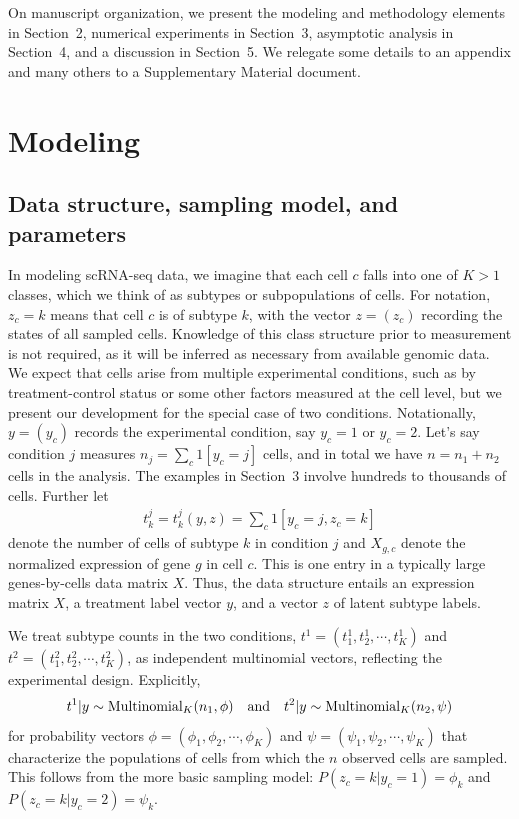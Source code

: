 \documentclass[aoas,preprint]{imsart}
\begin{document}
On manuscript organization, we present
the modeling and methodology elements in Section~2, numerical experiments in Section~3,  asymptotic analysis in Section~4, and a discussion
in Section~5.  We relegate some details to an appendix and many others to a Supplementary 
Material document.



\section{Modeling}
\subsection{Data structure, sampling model, and parameters}

In modeling scRNA-seq data, we
imagine that each cell $c$ falls into one of $K>1$ classes, which we think of as
subtypes or subpopulations of cells. For notation, $z_c=k$ means that cell $c$ is of subtype $k$, with the vector $z=(z_c)$ recording
the states of all sampled cells.  Knowledge of this class structure
 prior to measurement is not required, as it will be inferred as necessary from
 available genomic data.   We expect that cells arise from multiple
experimental conditions, such as by treatment-control status or some other factors
 measured at the cell level, but we present our development for the special
case of two conditions.  Notationally, $y=(y_c)$ records the experimental condition, say $y_c=1$ or $y_c=2$.
 Let's say condition $j$ measures $n_j=\sum_{c} 1[y_c=j]$ cells,  and
in total we have $n=n_1+n_2$ cells in the analysis.  The examples in Section~3 involve hundreds to thousands of cells.
Further let \begin{eqnarray}
\label{eq:counts}
t^j_k = t^j_k(y,z) = \sum_c 1[y_c=j, z_c=k] 
\end{eqnarray}
denote the number of cells of subtype $k$ in condition $j$
and $X_{g,c}$ denote
the normalized expression of gene $g$ in cell $c$. This is one entry
in a typically large genes-by-cells data matrix $X$.  Thus, the data structure entails an expression matrix
$X$, a treatment label vector $y$, and a vector $z$ of latent subtype labels.


We treat subtype counts in the two conditions,  $t^1 = (t^1_1, t^1_2, \cdots, t^1_K )$ and 
$t^2 = (t^2_1, t^2_2, \cdots, t^2_K)$,  as independent multinomial
vectors, reflecting the experimental design.  Explicitly,
\begin{eqnarray}
\label{eq:mult}
t^1| y \sim \text{Multinomial}_K( n_1, \phi ) \quad {\mbox {\rm and}} \quad
t^2| y \sim \text{Multinomial}_K( n_2, \psi )
\end{eqnarray}
for probability vectors 
$\phi = (\phi_1, \phi_2, \cdots, \phi_K)$ and 
 $\psi = ( \psi_1, \psi_2, \cdots, \psi_K)$ that characterize the populations of
cells from which the $n$ observed cells are sampled.  This follows from the more basic 
sampling model:
$P(z_c=k|y_c=1) = \phi_k$ and $P(z_c=k| y_c =2 ) = \psi_k.$
\end{document}
